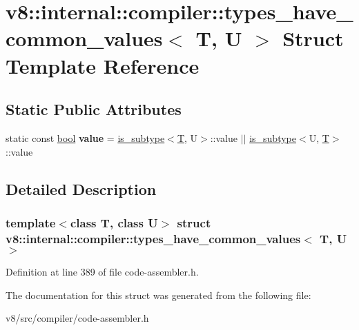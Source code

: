 \hypertarget{structv8_1_1internal_1_1compiler_1_1types__have__common__values}{}\section{v8\+:\+:internal\+:\+:compiler\+:\+:types\+\_\+have\+\_\+common\+\_\+values$<$ T, U $>$ Struct Template Reference}
\label{structv8_1_1internal_1_1compiler_1_1types__have__common__values}
\subsection*{Static Public Attributes}
\begin{DoxyCompactItemize}
\item 
\mbox{\label{structv8_1_1internal_1_1compiler_1_1types__have__common__values_a68944b953e90cefaa955888a4e62d664}} 
static const \mbox{\hyperlink{classbool}{bool}} {\bfseries value} = \mbox{\hyperlink{structv8_1_1internal_1_1compiler_1_1is__subtype}{is\+\_\+subtype}}$<$\mbox{\hyperlink{classv8_1_1internal_1_1torque_1_1T}{T}}, U$>$\+::value $\vert$$\vert$ \mbox{\hyperlink{structv8_1_1internal_1_1compiler_1_1is__subtype}{is\+\_\+subtype}}$<$U, \mbox{\hyperlink{classv8_1_1internal_1_1torque_1_1T}{T}}$>$\+::value
\end{DoxyCompactItemize}


\subsection{Detailed Description}
\subsubsection*{template$<$class T, class U$>$\newline
struct v8\+::internal\+::compiler\+::types\+\_\+have\+\_\+common\+\_\+values$<$ T, U $>$}



Definition at line 389 of file code-\/assembler.\+h.



The documentation for this struct was generated from the following file\+:\begin{DoxyCompactItemize}
\item 
v8/src/compiler/code-\/assembler.\+h\end{DoxyCompactItemize}
